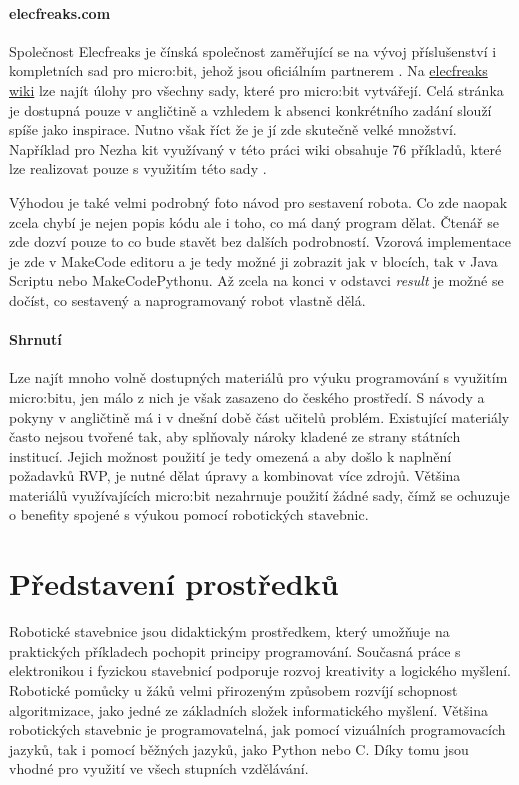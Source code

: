 \documentclass[
  digital,     %
  oneside,     %
  nosansbold,  %
  colorbold, %
  lof,         %
  nolot,         %
]{fithesis4}
\begin{document}
\subsubsection{elecfreaks.com}
Společnost Elecfreaks je čínská společnost zaměřující se na vývoj příslušenství i kompletních sad pro micro:bit, jehož jsou oficiálním partnerem \cite{elecfreaks}. Na \href{https://www.elecfreaks.com/learn-en/index.html}{elecfreaks wiki} lze najít úlohy pro všechny sady, které pro micro:bit vytvářejí. Celá stránka je dostupná pouze v angličtině a vzhledem k absenci konkrétního zadání slouží spíše jako inspirace. Nutno však říct že je jí zde skutečně velké množství. Například pro Nezha kit využívaný v této práci wiki obsahuje 76 příkladů, které lze realizovat pouze s využitím této sady \cite{nezhaelecfreaks}. 

Výhodou je také velmi podrobný foto návod pro sestavení robota. Co zde naopak zcela chybí je nejen popis kódu ale i toho, co má daný program dělat. Čtenář se zde dozví pouze to co bude stavět bez dalších podrobností. Vzorová implementace je zde v MakeCode editoru a je tedy možné ji zobrazit jak v blocích, tak v Java Scriptu nebo MakeCodePythonu. Až zcela na konci v odstavci \textit{result} je možné se dočíst, co sestavený a naprogramovaný robot vlastně dělá.

\subsubsection{Shrnutí}
Lze najít mnoho volně dostupných materiálů pro výuku programování s využitím micro:bitu, jen málo z nich je však zasazeno do českého prostředí. S návody a pokyny v angličtině má i v dnešní době část učitelů problém. Existující materiály často nejsou tvořené tak, aby splňovaly nároky kladené ze strany státních institucí. Jejich možnost použití je tedy omezená a aby došlo k naplnění požadavků RVP, je nutné dělat úpravy a kombinovat více zdrojů. Většina materiálů využívajících micro:bit nezahrnuje použití žádné sady, čímž se ochuzuje o benefity spojené s výukou pomocí robotických stavebnic.

\chapter{Představení prostředků}
Robotické stavebnice jsou didaktickým prostředkem, který umožňuje na praktických příkladech pochopit principy programování. Současná práce s elektronikou i fyzickou stavebnicí podporuje rozvoj kreativity a logického myšlení. Robotické pomůcky u žáků velmi přirozeným způsobem rozvíjí schopnost algoritmizace, jako jedné ze základních složek informatického myšlení. Většina robotických stavebnic je programovatelná, jak pomocí vizuálních programovacích jazyků, tak i pomocí běžných jazyků, jako Python nebo C. Díky tomu jsou vhodné pro využití ve všech stupních vzdělávání. 
\end{document}
